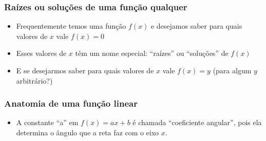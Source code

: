 \documentclass[usenames,dvipsnames,svgnames]{beamer}
\begin{document}
\begin{frame}
	\frametitle{Raízes ou soluções de uma função qualquer}

	\begin{itemize}
		\item Frequentemente temos uma função $f(x)$ e desejamos saber para quais valores de $x$ vale $f(x) = 0$
		\item Esses valores de $x$ têm um nome especial: ``raízes'' ou ``soluções'' de $f(x)$
		\item E se desejarmos saber para quais valores de $x$ vale $f(x) = y$ (para algum $y$ arbitrário?)
	\end{itemize}

\end{frame}

\begin{frame}
	\frametitle{Anatomia de uma função linear}

	\begin{itemize}
		\item A constante ``a'' em $f(x) = ax + b$ é chamada ``coeficiente angular'', pois ela determina o ângulo que a reta faz com o eixo $x$.
	\end{itemize}

	\begin{adjustbox}{max totalsize={\textwidth}{.6\textheight},center}
	\end{adjustbox}
\end{frame}
\end{document}
